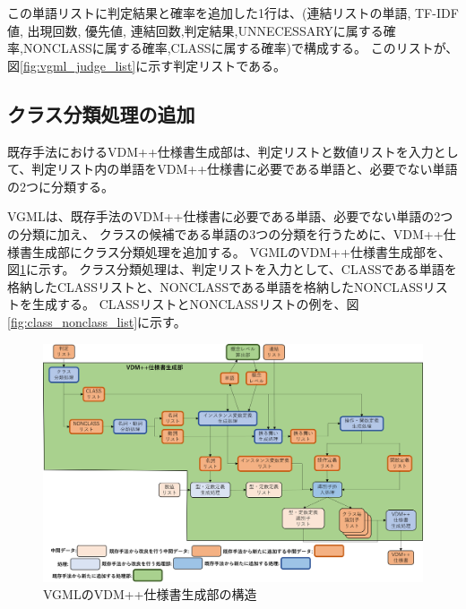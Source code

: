 この単語リストに判定結果と確率を追加した1行は、(連結リストの単語, TF-IDF値, 出現回数, 優先値, 連結回数,判定結果,UNNECESSARYに属する確率,NONCLASSに属する確率,CLASSに属する確率)で構成する。
このリストが、図\ref{fig:vgml_judge_list}に示す判定リストである。

\subsection{クラス分類処理の追加}
\label{sec:classifier_class}
既存手法におけるVDM++仕様書生成部は、判定リストと数値リストを入力として、判定リスト内の単語をVDM++仕様書に必要である単語と、必要でない単語の2つに分類する。

VGMLは、既存手法のVDM++仕様書に必要である単語、必要でない単語の2つの分類に加え、
クラスの候補である単語の3つの分類を行うために、VDM++仕様書生成部にクラス分類処理を追加する。
VGMLのVDM++仕様書生成部を、図\ref{fig:vgml_generator}に示す。
クラス分類処理は、判定リストを入力として、CLASSである単語を格納したCLASSリストと、NONCLASSである単語を格納したNONCLASSリストを生成する。
CLASSリストとNONCLASSリストの例を、図\ref{fig:class_nonclass_list}に示す。

\begin{figure}[t]
    \begin{center}
        \includegraphics[width=1.0\columnwidth]{image/vgml_generator.png}
        \caption{VGMLのVDM++仕様書生成部の構造}
        \label{fig:vgml_generator}
    \end{center}
\end{figure}

